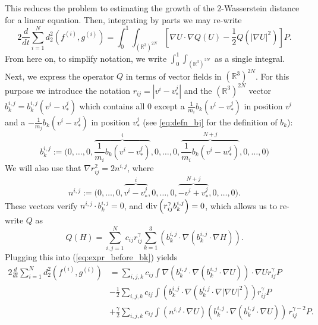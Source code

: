 \documentclass[10pt,oneside]{amsart}
\numberwithin{equation}{section}
\numberwithin{definition}{section}
\numberwithin{theorem}{section}
\numberwithin{lemma}{section}
\begin{document}
%
%
This reduces the problem to estimating the growth of the $2$-Wasserstein distance for a linear equation. Then, integrating by parts we may re-write
%
\begin{equation}\label{eq:expr_before_bk}
  2\frac{d}{dt}\sum_{i=1}^Nd_2^2(f^{(i)},g^{(i)}) =\int_{0}^{1}\int_{(\mathbb R^3)^{2N}}\left[\nabla U\cdot\nabla Q(U)-\frac{1}{2}Q\left(|\nabla U|^{2}\right)\right]P.
\end{equation}
%
From here on, to simplify notation, we write $\int_{0}^{1}\int_{(\mathbb R^3)^{2N}}$ as a single integral. Next, we express the operator $Q$ in terms of vector fields in $(\mathbb R^3)^{2N}$. For this purpose we introduce the notation $r_{ij}=|v^{i}-v_*^{j}|$ and the $\left(\mathbb{R}^{3}\right)^{2N}$ vector $b_{k}^{i,j}=b_{k}^{i,j}(v^{i}-v_*^{j})$ which contains all $0$ except a $\frac{1}{m_{i}}b_{k}(v^{i}-v_*^{j})$ in position $v^{i}$ and a $-\frac{1}{m_{j}}b_{k}(v^{i}-v_*^{j})$ in position $v_*^{j}$ (see \cref{eq:defn_bj} for the definition of $b_k$):
%
\begin{equation*}
  b_{k}^{i,j}:= \Big( 0 , \ldots,  0, \overbrace{\frac{1}{m_{i}}b_{k}(v^{i}-v_*^{j})}^i, 
  0,  \ldots, 0, \overbrace{\frac{1}{m_{i}}b_{k}(v^{i}-w_*^{j})}^{N+j},  0, \ldots, 0 \Big)
\end{equation*}
%
We will also use that $\nabla r_{ij}^{2}=2n^{i,j}$, where 
%
\begin{equation*}
  n^{i,j}:= \Big( 0 , \ldots,  0, \overbrace{v^i-v_*^j}^i, 
  0,  \ldots, 0, \overbrace{-v^i+v_*^j}^{N+j},  0, \ldots, 0 \Big).
\end{equation*}
%
These vectors verify $n^{i,j}\cdot b_{k}^{i,j}=0$, and $\textnormal{div}\left(r_{ij}^\gamma b_{k}^{i,j}\right)=0$, which allows us to re-write $Q$ as
%
\begin{equation*}
  Q(H)=\sum_{i,j=1}^{N}c_{ij}r_{ij}^{\gamma}\sum_{k=1}^{3}\left(b_{k}^{i,j}\cdot\nabla\left(b_{k}^{i,j}\cdot\nabla H\right)\right).
\end{equation*}
%
Plugging this into (\ref{eq:expr_before_bk}) yields
%
\begin{align}
  2\frac{d}{dt}\sum_{i=1}^Nd_2^2(f^{(i)},g^{(i)}) & 
  =\sum_{i,j,k}c_{ij}\int\nabla\left(b_{k}^{i,j}\cdot\nabla\left(b_{k}^{i,j}\cdot\nabla U\right)\right)\cdot\nabla Ur_{ij}^{\gamma}P
  \label{eq:analog_heat_multiespecies1}\\
  & -\frac{1}{2}\sum_{i,j,k}c_{ij}\int\left(b_{k}^{i,j}\cdot\nabla\left(b_{k}^{i,j}\cdot\nabla|\nabla U|^{2}\right)\right)r_{ij}^{\gamma}P	
  \label{eq:analog_heat_multiespecies2}\\
  & +\frac{\gamma}{2}\sum_{i,j,k}c_{ij}\int\left(n^{i,j}\cdot\nabla U\right)\left(b_{k}^{i,j}\cdot\nabla\left(b_{k}^{i,j}\cdot\nabla U\right)\right)\,r_{ij}^{\gamma-2}P.\nonumber
\end{align}
\end{document}
